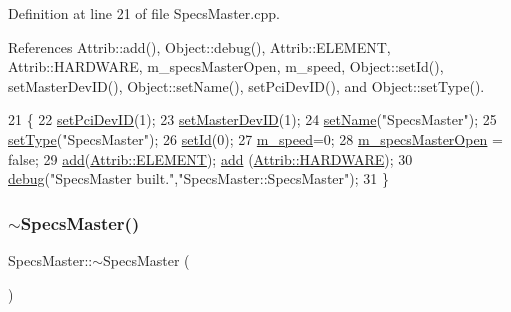 Definition at line 21 of file Specs\+Master.\+cpp.



References Attrib\+::add(), Object\+::debug(), Attrib\+::\+E\+L\+E\+M\+E\+NT, Attrib\+::\+H\+A\+R\+D\+W\+A\+RE, m\+\_\+specs\+Master\+Open, m\+\_\+speed, Object\+::set\+Id(), set\+Master\+Dev\+I\+D(), Object\+::set\+Name(), set\+Pci\+Dev\+I\+D(), and Object\+::set\+Type().


\begin{DoxyCode}
21                         \{
22   \hyperlink{classSpecsMaster_a3c55e5652286c35baa41fccd240c8cb5}{setPciDevID}(1);
23   \hyperlink{classSpecsMaster_acb635bc974bb3f4528e769251c3b30a9}{setMasterDevID}(1);
24   \hyperlink{classObject_ae30fea75683c2d149b6b6d17c09ecd0c}{setName}(\textcolor{stringliteral}{"SpecsMaster"});
25   \hyperlink{classObject_aae534cc9d982bcb9b99fd505f2e103a5}{setType}(\textcolor{stringliteral}{"SpecsMaster"});
26   \hyperlink{classObject_a398fe08cba594a0ce6891d59fe4f159f}{setId}(0);
27   \hyperlink{classSpecsMaster_af75996281787299ccd92555512802814}{m\_speed}=0;
28   \hyperlink{classSpecsMaster_aff461467e5aa5fdc853bfeecbd722db4}{m\_specsMasterOpen} = \textcolor{keyword}{false};
29   \hyperlink{classAttrib_a235f773af19c900264a190b00a3b4ad7}{add}(\hyperlink{classAttrib_a69e171d7cc6417835a5a306d3c764235a7788bc5dd333fd8ce18562b269c9dab1}{Attrib::ELEMENT}); \hyperlink{classAttrib_a235f773af19c900264a190b00a3b4ad7}{add} (\hyperlink{classAttrib_a69e171d7cc6417835a5a306d3c764235a61ceb22149f365f1780d18f9d1459423}{Attrib::HARDWARE});
30   \hyperlink{classObject_aac010553f022165573714b7014a15f0d}{debug}(\textcolor{stringliteral}{"SpecsMaster built."},\textcolor{stringliteral}{"SpecsMaster::SpecsMaster"});
31 \}
\end{DoxyCode}
\mbox{\label{classSpecsMaster_af55a9b3b84f9bbf62ecb866627e429ba}} 
\subsubsection{\texorpdfstring{$\sim$\+Specs\+Master()}{~SpecsMaster()}}
{\footnotesize\ttfamily Specs\+Master\+::$\sim$\+Specs\+Master (\begin{DoxyParamCaption}{ }\end{DoxyParamCaption})}



